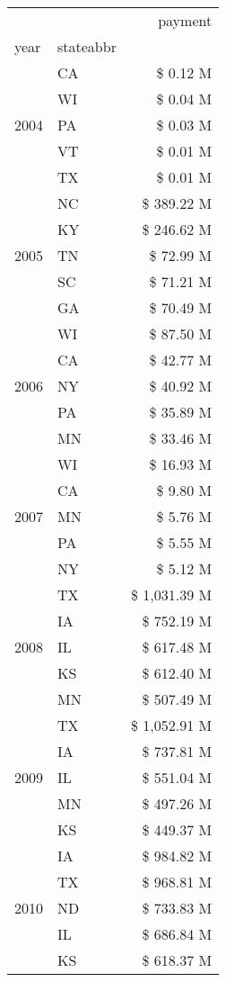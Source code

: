 \begin{tabular}{llr}
\toprule
 &  & payment \\
year & stateabbr &  \\
\midrule
\multirow[t]{5}{*}{2004} & CA & \$ 0.12 M \\
 & WI & \$ 0.04 M \\
 & PA & \$ 0.03 M \\
 & VT & \$ 0.01 M \\
 & TX & \$ 0.01 M \\
\cline{1-3}
\multirow[t]{5}{*}{2005} & NC & \$ 389.22 M \\
 & KY & \$ 246.62 M \\
 & TN & \$ 72.99 M \\
 & SC & \$ 71.21 M \\
 & GA & \$ 70.49 M \\
\cline{1-3}
\multirow[t]{5}{*}{2006} & WI & \$ 87.50 M \\
 & CA & \$ 42.77 M \\
 & NY & \$ 40.92 M \\
 & PA & \$ 35.89 M \\
 & MN & \$ 33.46 M \\
\cline{1-3}
\multirow[t]{5}{*}{2007} & WI & \$ 16.93 M \\
 & CA & \$ 9.80 M \\
 & MN & \$ 5.76 M \\
 & PA & \$ 5.55 M \\
 & NY & \$ 5.12 M \\
\cline{1-3}
\multirow[t]{5}{*}{2008} & TX & \$ 1,031.39 M \\
 & IA & \$ 752.19 M \\
 & IL & \$ 617.48 M \\
 & KS & \$ 612.40 M \\
 & MN & \$ 507.49 M \\
\cline{1-3}
\multirow[t]{5}{*}{2009} & TX & \$ 1,052.91 M \\
 & IA & \$ 737.81 M \\
 & IL & \$ 551.04 M \\
 & MN & \$ 497.26 M \\
 & KS & \$ 449.37 M \\
\cline{1-3}
\multirow[t]{5}{*}{2010} & IA & \$ 984.82 M \\
 & TX & \$ 968.81 M \\
 & ND & \$ 733.83 M \\
 & IL & \$ 686.84 M \\
 & KS & \$ 618.37 M \\

\end{tabular}
